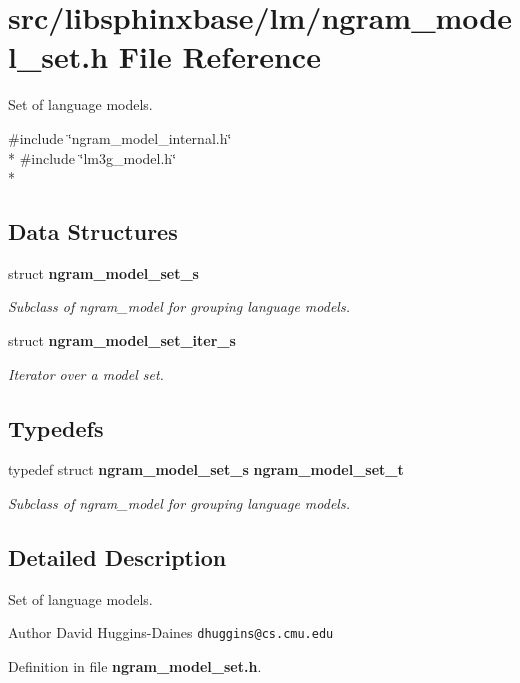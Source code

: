 \section{src/libsphinxbase/lm/ngram\-\_\-model\-\_\-set.h File Reference}
\label{ngram__model__set_8h}


Set of language models.  


{\ttfamily \#include \char`\"{}ngram\-\_\-model\-\_\-internal.\-h\char`\"{}}\\*
{\ttfamily \#include \char`\"{}lm3g\-\_\-model.\-h\char`\"{}}\\*
\subsection*{Data Structures}
\begin{DoxyCompactItemize}
\item 
struct {\bf ngram\-\_\-model\-\_\-set\-\_\-s}
\begin{DoxyCompactList}\small\item\em Subclass of ngram\-\_\-model for grouping language models. \end{DoxyCompactList}\item 
struct {\bf ngram\-\_\-model\-\_\-set\-\_\-iter\-\_\-s}
\begin{DoxyCompactList}\small\item\em Iterator over a model set. \end{DoxyCompactList}\end{DoxyCompactItemize}
\subsection*{Typedefs}
\begin{DoxyCompactItemize}
\item 
typedef struct {\bf ngram\-\_\-model\-\_\-set\-\_\-s} {\bf ngram\-\_\-model\-\_\-set\-\_\-t}\label{ngram__model__set_8h_af89b4060ed18e3f4e3ac0490a09d5745}

\begin{DoxyCompactList}\small\item\em Subclass of ngram\-\_\-model for grouping language models. \end{DoxyCompactList}\end{DoxyCompactItemize}


\subsection{Detailed Description}
Set of language models. \begin{DoxyAuthor}{Author}
David Huggins-\/\-Daines {\tt dhuggins@cs.\-cmu.\-edu} 
\end{DoxyAuthor}


Definition in file {\bf ngram\-\_\-model\-\_\-set.\-h}.

